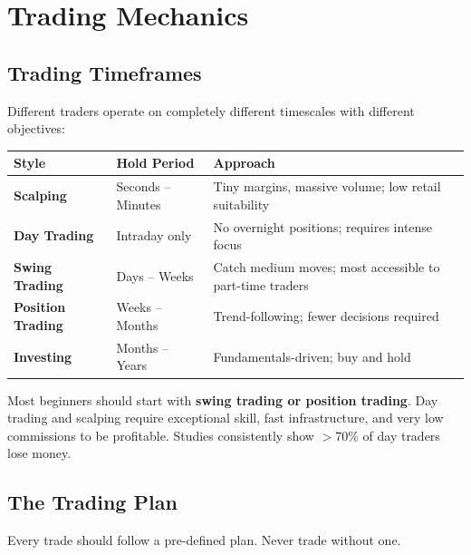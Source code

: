 
\chapter{Trading Mechanics}

\section{Trading Timeframes}

Different traders operate on completely different timescales with different objectives:

\begin{center}
\begin{tabular}{>{\bfseries}p{3.5cm} p{3.5cm} p{6cm}}
\toprule
Style & Hold Period & Approach \\
\midrule
Scalping & Seconds -- Minutes & Tiny margins, massive volume; low retail suitability \\
Day Trading & Intraday only & No overnight positions; requires intense focus \\
Swing Trading & Days -- Weeks & Catch medium moves; most accessible to part-time traders \\
Position Trading & Weeks -- Months & Trend-following; fewer decisions required \\
Investing & Months -- Years & Fundamentals-driven; buy and hold \\
\bottomrule
\end{tabular}
\end{center}

\begin{notebox}
Most beginners should start with \textbf{swing trading or position trading}. Day trading and
scalping require exceptional skill, fast infrastructure, and very low commissions to be
profitable. Studies consistently show $>$70\% of day traders lose money.
\end{notebox}

\section{The Trading Plan}

Every trade should follow a pre-defined plan. Never trade without one.


